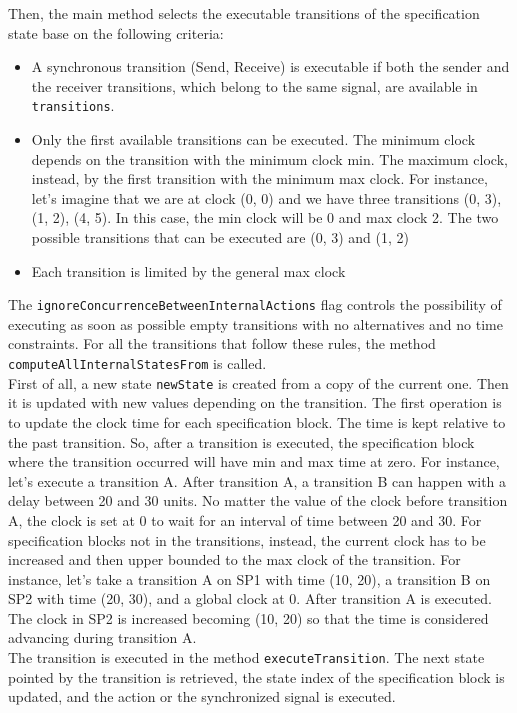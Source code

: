 \documentclass[12pt]{article}
\begin{document}
Then, the main method selects the executable transitions of the specification state base on the following criteria:
\begin{itemize}
\item A synchronous transition (Send, Receive) is executable if both the sender and the receiver transitions, which belong to the same signal, are available in \texttt{transitions}.
\item Only the first available transitions can be executed. The minimum clock depends on the transition with the minimum clock min. The maximum clock, instead, by the first transition with the minimum max clock. For instance, let's imagine that we are at clock (0, 0) and we have three transitions (0, 3), (1, 2), (4, 5). In this case, the min clock will be 0 and max clock 2. The two possible transitions that can be executed are (0, 3) and (1, 2)
\item Each transition is limited by the general max clock
\end{itemize}
The \texttt{ignoreConcurrenceBetweenInternalActions} flag controls the possibility of executing as soon as possible empty transitions with no alternatives and no time constraints. For all the transitions that follow these rules, the method \texttt{computeAllInternalStatesFrom} is called.\\

First of all, a new state \texttt{newState} is created from a copy of the current one. Then it is updated with new values depending on the transition. The first operation is to update the clock time for each specification block. The time is kept relative to the past transition. So, after a transition is executed, the specification block where the transition occurred will have min and max time at zero. For instance, let's execute a transition A. After transition A, a transition B can happen with a delay between 20 and 30 units. No matter the value of the clock before transition A, the clock is set at 0 to wait for an interval of time between 20 and 30. For specification blocks not in the transitions, instead, the current clock has to be increased and then upper bounded to the max clock of the transition. For instance, let's take a transition A on SP1 with time (10, 20), a transition B on SP2 with time (20, 30), and a global clock at 0. After transition A is executed. The clock in SP2 is increased becoming (10, 20) so that the time is considered advancing during transition A.\\

The transition is executed in the method \texttt{executeTransition}. The next state pointed by the transition is retrieved, the state index of the specification block is updated, and the action or the synchronized signal is executed.\\
\end{document}
